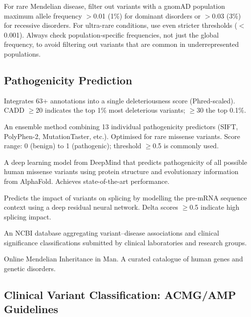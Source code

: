 \begin{tipbox}[title={Population Frequency Filtering}]
For rare Mendelian disease, filter out variants with a gnomAD population maximum allele frequency $>$0.01 (1\%) for dominant disorders or $>$0.03 (3\%) for recessive disorders. For ultra-rare conditions, use even stricter thresholds ($<$0.001). Always check population-specific frequencies, not just the global frequency, to avoid filtering out variants that are common in underrepresented populations.
\end{tipbox}

\subsection{Pathogenicity Prediction}

\begin{description}[style=nextline]
  \item[CADD (Combined Annotation Dependent Depletion)] Integrates 63+ annotations into a single deleteriousness score (Phred-scaled). CADD $\geq$20 indicates the top 1\% most deleterious variants; $\geq$30 the top 0.1\%.
  \item[REVEL (Rare Exome Variant Ensemble Learner)] An ensemble method combining 13 individual pathogenicity predictors (SIFT, PolyPhen-2, MutationTaster, etc.). Optimised for rare missense variants. Score range: 0 (benign) to 1 (pathogenic); threshold $\geq$0.5 is commonly used.
  \item[AlphaMissense] A deep learning model from DeepMind that predicts pathogenicity of all possible human missense variants using protein structure and evolutionary information from AlphaFold. Achieves state-of-the-art performance.
  \item[SpliceAI] Predicts the impact of variants on splicing by modelling the pre-mRNA sequence context using a deep residual neural network. Delta scores $\geq$0.5 indicate high splicing impact.
  \item[ClinVar] An NCBI database aggregating variant--disease associations and clinical significance classifications submitted by clinical laboratories and research groups.
  \item[OMIM] Online Mendelian Inheritance in Man. A curated catalogue of human genes and genetic disorders.
\end{description}

\subsection{Clinical Variant Classification: ACMG/AMP Guidelines}

